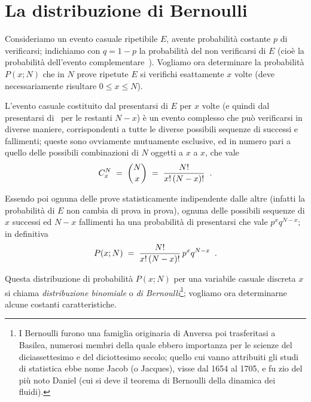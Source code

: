 \section{La distribuzione di Bernoulli}%
%
%
\label{ch:8.binom}
Consideriamo un evento casuale ripetibile $E$, avente
probabilit\`a costante $p$ di verificarsi; indichiamo con $q
= 1 - p$ la probabilit\`a del non verificarsi di $E$ (cio\`e
la probabilit\`a dell'evento complementare \,).
Vogliamo ora determinare la probabilit\`a $P(x;N)$ che in
$N$ prove ripetute $E$ si verifichi esattamente $x$ volte
(deve necessariamente risultare $0 \le x \le N$).

L'evento casuale costituito dal presentarsi di $E$ per $x$
volte (e quindi dal presentarsi di \ per le restanti
$N - x$) \`e un evento complesso che pu\`o verificarsi in
diverse maniere, corrispondenti a tutte le diverse possibili
sequenze di successi e fallimenti; queste sono ovviamente
mutuamente esclusive, ed in numero pari a quello delle
possibili combinazioni di $N$ oggetti a $x$ a $x$, che vale
\begin{equation*}
  C^N_x \; = \; \binom{N}{x} \; = \; \frac{N!}{x! \,
    (N-x)!} \;\; .
\end{equation*}

Essendo poi ognuna delle prove statisticamente indipendente
dalle altre (infatti la probabilit\`a di $E$ non cambia di
prova in prova), ognuna delle possibili sequenze di $x$
successi ed $N-x$ fallimenti ha una probabilit\`a di
presentarsi che vale $p^x q^{N-x}$; in definitiva
\begin{equation} \label{eq:8.binom}
  P(x;N) \; = \; \frac{N!}{x! \, (N-x)!} \,
    p^x q^{N-x} \;\; .
\end{equation}

Questa distribuzione di probabilit\`a $ P(x;N) $ per una
variabile casuale discreta $x$ si chiama \emph{distribuzione
  binomiale} o \emph{di Bernoulli}\thinspace\footnote{I
  Bernoulli furono una famiglia originaria di Anversa poi
  trasferitasi a Basilea, numerosi membri della quale ebbero
  importanza per le scienze del diciassettesimo e del
  diciottesimo secolo; quello cui vanno attribuiti gli studi
  di statistica ebbe nome Jacob (o Jacques), visse dal 1654
  al 1705, e fu zio del pi\`u noto Daniel (cui si deve il
  teorema di Bernoulli della dinamica dei fluidi).};%
vogliamo ora determinarne alcune costanti caratteristiche.

